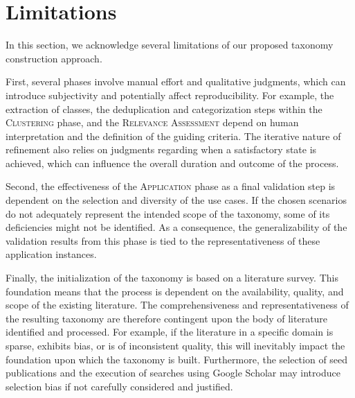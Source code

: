 
\section{Limitations}
\label{sec:tax_proce_limitations}

In this section, we acknowledge several limitations of our proposed taxonomy construction approach. 

First, several phases involve manual effort and qualitative judgments, which can introduce subjectivity and potentially affect reproducibility. For example, the extraction of classes, the deduplication and categorization steps within the \textsc{Clustering} phase, and the \textsc{Relevance Assessment} depend on human interpretation and the definition of the guiding criteria. The iterative nature of refinement also relies on judgments regarding when a satisfactory state is achieved, which can influence the overall duration and outcome of the process.

Second, the effectiveness of the \textsc{Application} phase as a final validation step is dependent on the selection and diversity of the use cases. If the chosen scenarios do not adequately represent the intended scope of the taxonomy, some of its deficiencies might not be identified. As a consequence, the generalizability of the validation results from this phase is tied to the representativeness of these application instances.

Finally, the initialization of the taxonomy is based on a literature survey. This foundation means that the process is dependent on the availability, quality, and scope of the existing literature. The comprehensiveness and representativeness of the resulting taxonomy are therefore contingent upon the body of literature identified and processed. For example, if the literature in a specific domain is sparse, exhibits bias, or is of inconsistent quality, this will inevitably impact the foundation upon which the taxonomy is built. Furthermore, the selection of seed publications and the execution of searches using Google Scholar may introduce selection bias if not carefully considered and justified.